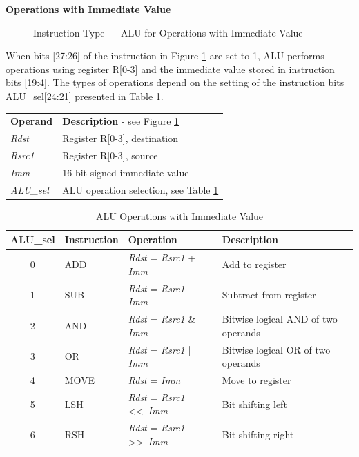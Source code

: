 \documentclass[main\_\_EN.tex]{subfiles}
\begin{document}
\textcolor{istcolor}{\textbf{  Operations with Immediate Value }}

%
%
%
%
%
%
%
%
\begin{figure}[!ht ]
    \centering
    \caption{Instruction Type — ALU for Operations with Immediate Value}
    \label{figure:ALU-with-immediate-value}
\end{figure}

When bits [27:26] of the instruction in Figure \ref{figure:ALU-with-immediate-value} are set to 1, ALU performs operations using register R[0-3] and the immediate value stored in instruction bits [19:4]. The types of operations depend on the setting of the instruction bits ALU\_sel[24:21] presented in Table \ref{table:ALU-with-immediate-value}.

\begin{tabular}{ l l }
\textbf{Operand} & \textbf{Description} - see Figure \ref{figure:ALU-with-immediate-value} \\
\textit{Rdst} & Register R[0-3], destination \\
\textit{Rsrc1} & Register R[0-3], source \\
\textit{Imm} & 16-bit signed immediate value\\
\textit{ALU\_sel} & ALU operation selection, see Table \ref{table:ALU-with-immediate-value}
\end{tabular}

\begin{table}[!ht ]
    \centering
    \begin{tabular}{ c l l l }
    \textbf{ALU\_sel} & \textbf{Instruction} & \textbf{Operation} & \textbf{Description} \\ \hline
    0 & ADD & \textit{Rdst} = \textit{Rsrc1} + \textit{Imm} & Add to register \\
    1 & SUB & \textit{Rdst} = \textit{Rsrc1} - \textit{Imm} & Subtract from register \\
    2 & AND & \textit{Rdst} = \textit{Rsrc1} \& \textit{Imm} & Bitwise logical AND of two operands \\
    3 & OR & \textit{Rdst} = \textit{Rsrc1} | \textit{Imm} & Bitwise logical OR of two operands \\
    4 & MOVE & \textit{Rdst} = \textit{Imm} & Move to register \\
    5 & LSH & \textit{Rdst} = \textit{Rsrc1} \textless\textless\ \textit{Imm} & Bit shifting left \\
    6 & RSH & \textit{Rdst} = \textit{Rsrc1} \textgreater\textgreater\ \textit{Imm} & Bit shifting right \\
    \end{tabular}
    \caption{ALU Operations with Immediate Value}
    \label{table:ALU-with-immediate-value}
\end{table}
\end{document}
